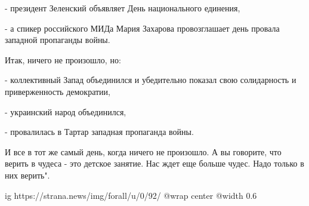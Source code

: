 - президент Зеленский объявляет День национального единения,

- а спикер российского МИДа Мария Захарова провозглашает день провала западной
пропаганды войны.

Итак, ничего не произошло, но:

- коллективный Запад объединился и убедительно показал свою солидарность и
приверженность демократии,

- украинский народ объединился,

- провалилась в Тартар западная пропаганда войны.

И все в тот же самый день, когда ничего не произошло. А вы говорите, что верить
в чудеса - это детское занятие. Нас ждет еще больше чудес. Надо только в них
верить".

\ifcmt
  ig https://strana.news/img/forall/u/0/92/%
  @wrap center
  @width 0.6
\fi
